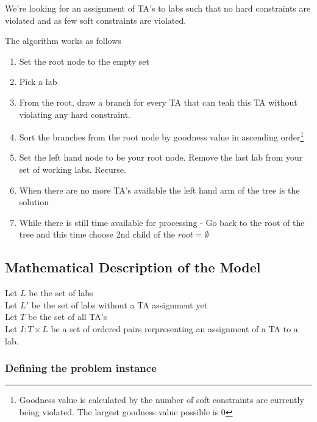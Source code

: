 \documentclass{article}
\begin{document}
We're looking for an assignment of TA's to labs such that no hard
constraints are violated and as few soft constraints are violated.

The algorithm works as follows

\begin{enumerate}

\item Set the root node to the empty set

\item Pick a lab

\item From the root, draw a branch for every TA that can teah this TA
  without violating any hard constraint.
  

\item Sort the branches from the root node by goodness value in
  ascending order\footnote{Goodness value is calculated by the number
    of soft constraints are currently being violated. The largest
    goodness value possible is 0} 


\item Set the left hand node to be your root node. Remove the last lab
  from your set of working labs. Recurse.

\item When there are no more TA's available the left hand arm of the tree
  is the solution

\item While there is still time available for processing - Go back to
  the root of the tree and this time choose 2nd child of the $root = \emptyset$

\end{enumerate}

\subsection{Mathematical Description of the Model}

Let $L$ be the set of labs\\

Let $L'$ be the set of labs without a TA assignment yet\\

Let $T$ be the set of all TA's\\

Let $I : T \times L$ be a set of ordered pairs rerpresenting an
assignment of a TA to a lab.

\subsubsection{Defining the problem instance}
\end{document}

